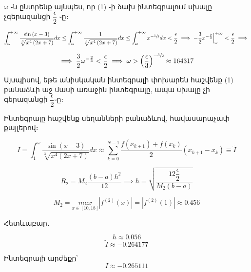 \documentclass{article}
\begin{document}
$\omega$ ֊ն ընտրենք այնպես, որ (1) ֊ի ձախ ինտեգրալում սխալը չգերազանցի $\dfrac{\epsilon}{2}$ ֊ը։

		$$\int_{\omega}^{+\infty}\dfrac{\sin\left(x - 3\right)}{\sqrt[3]{x^{4}\left(2x+7\right)}}dx  \leq \int_{\omega}^{+\infty}\dfrac{1}{\sqrt[3]{x^{4}\left(2x+7\right)}}dx \leq
		\int_{\omega}^{+\infty} x ^ {-\sfrac{5}{3}} dx < \dfrac{\epsilon}{2} \implies -\frac{3}{2} x ^ {-\frac{2}{3}} \Big |_{\omega}^{+\infty}  < \dfrac{\epsilon}{2} \implies$$

		$$ \implies\frac{3}{2}\omega^{-\frac{2}{3}} < \frac{\epsilon}{2} \implies \omega > \left(\dfrac{\epsilon}{3} \right)^{-\sfrac{3}{2}} \approx 164317$$


Այսպիսով, եթե անիսկական ինտեգրալի փոխարեն հաշվենք (1) բանաձևի աջ մասի առաջին ինտեգրալը, ապա սխալը չի գերազանցի $\dfrac{\epsilon}{2}$֊ը։

Ինտեգրալը հաշվենք սեղանների բանաձևով, հավասարաչափ քայլերով։

							$$I = \int_{1}^{\omega}\dfrac{\sin\left(x - 3\right)}{\sqrt[3]{x^{4}\left(2x+7\right)}}dx \approx  \sum_{k = 0}^{N - 1} \dfrac{f\left(x_{k+1}\right) + f\left(x_{k}\right)}{2}\left(x_{k + 1} - x_{k}\right) \equiv \tilde{I}$$

							$$R_2 = M_{2} \dfrac{\left(b - a\right)h^{2}}{12} \implies h = \sqrt{\dfrac{12 \dfrac{\epsilon}{2}}{M_{2}\left(b - a\right)}}$$
					
								$$M_{2} = \underset{x \in \left[10, 18\right]}{max}\left|f^{\left(2\right)}\left(x\right)\right| = \left|f^{\left(2\right)}\left(1\right)\right| \approx 0.456$$

Հետևաբար․
					
							$$h \approx 0.056$$
							$$\tilde{I} \approx -0.264177$$

Ինտեգրալի արժեքը՝  $$ I \approx -0.265111$$
\end{document}
